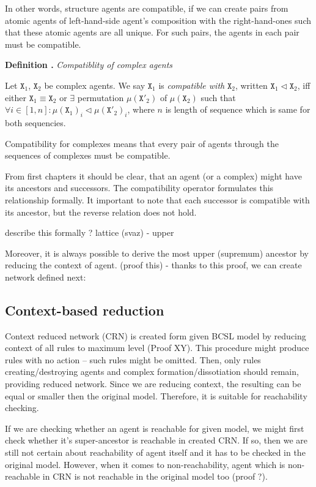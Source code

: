\documentclass[12pt]{fithesis2}
\newcounter{counter}[section]
\renewcommand{\thecounter}{\thesection.\arabic{counter}}
\newenvironment{definition}[1]{\bigskip\refstepcounter{counter}\noindent\textbf{Definition \thecounter } \textit{#1} \par\nopagebreak}{\bigskip}
\begin{document}
In other words, structure agents are compatible, if we can create pairs from atomic agents of left-hand-side agent's composition with the right-hand-ones such that these atomic agents are all unique. For such pairs, the agents in each pair must be compatible.

\begin{definition}{Compatiblity of complex agents}
Let $\mathtt{X}_1$, $\mathtt{X}_2$ be complex agents. We say $\mathtt{X}_1$ is \emph{compatible with} $\mathtt{X}_2$, written $\mathtt{X}_1 \lhd \mathtt{X}_2$, iff either $\mathtt{X}_1 \equiv \mathtt{X}_2$ or $\exists$ permutation $ \mu(\mathtt{X}'_2)$ of $\mu(\mathtt{X}_2)$ such that $ \forall i \in [1, n] : \mu(\mathtt{X}_1)_i \lhd \mu(\mathtt{X}'_2)_i $, where $n$ is length of sequence which is same for both sequencies.
\end{definition}

Compatibility for complexes means that every pair of agents through the sequences of complexes must be compatible.

From first chapters it should be clear, that an agent (or a complex) might have its ancestors and successors. The compatibility operator formulates this relationship formally. It important to note that each successor is compatible with its ancestor, but the reverse relation does not hold. 

describe this formally ? lattice (svaz) - upper

Moreover, it is always possible to derive the most upper (supremum) ancestor by reducing the context of agent. (proof this) - thanks to this proof, we can create network defined next:

\subsection{Context-based reduction}

Context reduced network (CRN) is created form given BCSL model by reducing context of all rules to maximum level (Proof XY). This procedure might produce rules with no action -- such rules might be omitted. Then, only rules creating/destroying agents and complex formation/dissotiation should remain, providing reduced network. Since we are reducing context, the resulting can be equal or smaller then the original model. Therefore, it is suitable for reachability checking. 

If we are checking whether an agent is reachable for given model, we might first check whether it's super-ancestor is reachable in created CRN. If so, then we are still not certain about reachability of agent itself and it has to be checked in the original model. However, when it comes to non-reachability, agent which is non-reachable in CRN is not reachable in the original model too (proof ?).
\end{document}
